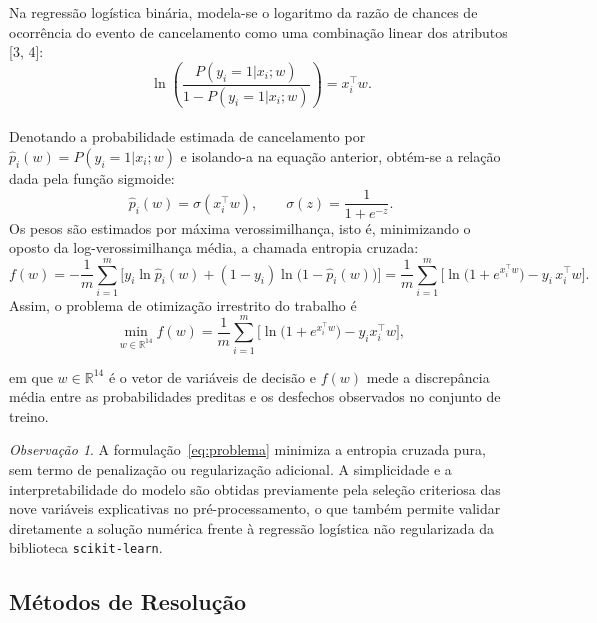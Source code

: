 \documentclass{article}
\theoremstyle{remark}
\newtheorem*{obs}{Observação}
\newenvironment{observacao}{\begin{obs}\small}{\end{obs}}
\begin{document}
Na regressão logística binária, modela-se o logaritmo da razão de chances de ocorrência do evento de cancelamento como uma combinação linear dos atributos [3, 4]:\\
\[
\ln \left( \frac{P(y_i = 1 | x_i;w)}{1-P(y_i = 1|x_i;w)}\right) = x_i^{\top}w.
\]\\
Denotando a probabilidade estimada de cancelamento por $\hat p_i(w) = P(y_i = 1 | x_i;w)$ e isolando-a na equação anterior, obtém-se a relação dada pela função sigmoide:
\[
\hat p_i(w) = \sigma(x_i^\top w), \qquad \sigma(z) = \frac{1}{1 + e^{-z}}.
\]
Os pesos são estimados por máxima verossimilhança, isto é, minimizando o oposto da log-verossimilhança média, a chamada entropia cruzada:
\[
f(w) = -\frac{1}{m} \sum_{i=1}^{m} \Big[ y_i \ln \hat p_i(w) + (1 - y_i) \ln \big(1 - \hat p_i(w)\big) \Big] = \frac{1}{m} \sum_{i=1}^{m} \Big[ \ln\big(1 + e^{x_i^\top w}\big) - y_i\, x_i^\top w \Big].
\]
Assim, o problema de otimização irrestrito do trabalho é
\begin{equation}
\min_{w \in \mathbb{R}^{14}} f(w) = \frac{1}{m}\sum_{i=1}^{m}\Big[\ln\!\big(1 + e^{x_i^{\top} w}\big) - y_i x_i^{\top} w\Big],
\label{eq:problema}
\end{equation}

em que $w \in \mathbb{R}^{14}$ é o vetor de variáveis de decisão e $f(w)$ mede a discrepância média entre as probabilidades preditas e os desfechos observados no conjunto de treino. \\

\begin{observacao}
A formulação~\eqref{eq:problema} minimiza a entropia cruzada pura, sem termo de penalização ou regularização adicional. A simplicidade e a interpretabilidade do modelo são obtidas previamente pela seleção criteriosa das nove variáveis explicativas no pré-processamento, o que também permite validar diretamente a solução numérica frente à regressão logística não regularizada da biblioteca \texttt{scikit-learn}.
\end{observacao}


\subsection{Métodos de Resolução}\label{subsec:metodos}
\end{document}
